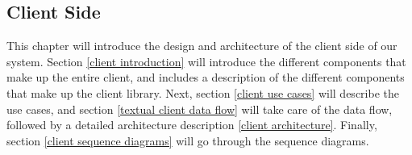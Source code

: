 \subsection{Client Side}\label{client side}

This chapter will introduce the design and architecture of the client side of our system. Section \ref{client introduction} will introduce the different components that make up the entire client, and includes a description of the different components that make up the client library. Next, section \ref{client use cases} will describe the use cases, and section \ref{textual client data flow} will take care of the data flow, followed by a detailed architecture description \ref{client architecture}. Finally, section \ref{client sequence diagrams} will go through the sequence diagrams.
		
